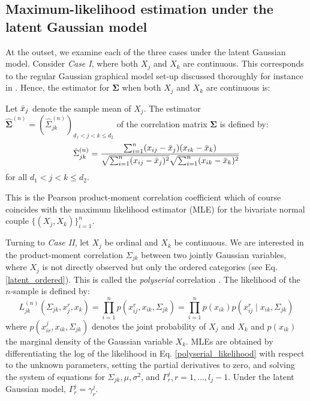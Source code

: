 \subsection{Maximum-likelihood estimation under the latent Gaussian model}\label{sec::latent_gaussian}

At the outset, we examine each of the three cases under the latent Gaussian model. Consider \textit{Case I}, where both $X_j$ and $X_k$ are continuous. This corresponds to the regular Gaussian graphical model set-up discussed thoroughly for instance in \citet{Ravikumar11}. Hence, the estimator for $\mathbf\Sigma$ when both $X_j$ and $X_k$ are continuous is:
\begin{definition}\label{def1}
    Let $\Bar{x}_j$ denote the sample mean of $X_j$. The estimator $\hat{\mathbf{\Sigma}}^{(n)} = (\hat{\Sigma}_{jk}^{(n)})_{d_1 < j < k\leq d_2}$ of the correlation matrix $\mathbf{\Sigma}$ is defined by:
    \begin{equation}
            \hat{\Sigma}_{jk}^{(n)} = \frac{\sum_{i=1}^n(x_{ij}- \Bar{x}_j)(x_{ik}- \Bar{x}_k)}{\sqrt{\sum_{i=1}^n(x_{ij}- \Bar{x}_j)^2} \sqrt{\sum_{i=1}^n(x_{ik}- \Bar{x}_k)^2}}
    \end{equation}
    for all $d_1 < j < k \leq d_2$.
\end{definition}
This is the Pearson product-moment correlation coefficient which of course coincides with the maximum likelihood estimator (MLE) for the bivariate normal couple $\{(X_j, X_k)\}_{i=1}^n$.

Turning to \textit{Case II}, let $X_j$ be ordinal and $X_k$ be continuous. We are interested in the product-moment correlation $\Sigma_{jk}$ between two jointly Gaussian variables, where $X_j$ is not directly observed but only the ordered categories (see Eq. \eqref{latent_ordered}). This is called the \textit{polyserial} correlation \citep{Olsson82}. The likelihood of the $n$-sample is defined by:
\begin{equation}\label{polyserial_likelihood}
        L_{jk}^{(n)}(\Sigma_{jk}, x_j^r,x_k) = \prod_{i=1}^n p(x^r_{ij},x_{ik}, \Sigma_{jk}) = \prod_{i=1}^n p(x_{ik})p(x^r_{ij} \mid x_{ik}, \Sigma_{jk})
\end{equation}
where $p(x^j_{ir},x_{ik}, \Sigma_{jk})$ denotes the joint probability of  $X_j$ and $X_k$ and $p(x_{ik})$ the marginal density of the Gaussian variable $X_k$. MLEs are obtained by differentiating the log of the likelihood in Eq. \eqref{polyserial_likelihood} with respect to the unknown parameters, setting the partial derivatives to zero, and solving the system of equations for $\Sigma_{jk}, \mu, \sigma^2$, and $\Gamma^j_r, r = 1, \dots, l_j-1$. Under the latent Gaussian model, \(\Gamma^j_r = \gamma^j_r\).

